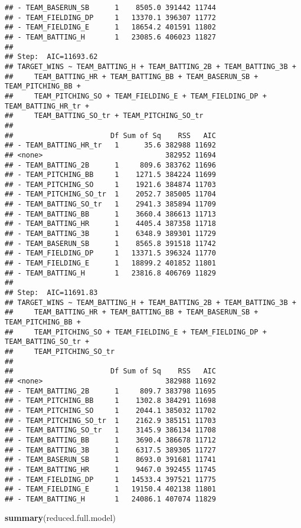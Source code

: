 \documentclass[]{article}
\newenvironment{Shaded}{\begin{snugshade}}{\end{snugshade}}
\newcommand{\KeywordTok}[1]{\textcolor[rgb]{0.13,0.29,0.53}{\textbf{#1}}}
\newcommand{\NormalTok}[1]{#1}
\begin{document}
\begin{verbatim}
## - TEAM_BASERUN_SB      1    8505.0 391442 11744
## - TEAM_FIELDING_DP     1   13370.1 396307 11772
## - TEAM_FIELDING_E      1   18654.2 401591 11802
## - TEAM_BATTING_H       1   23085.6 406023 11827
## 
## Step:  AIC=11693.62
## TARGET_WINS ~ TEAM_BATTING_H + TEAM_BATTING_2B + TEAM_BATTING_3B + 
##     TEAM_BATTING_HR + TEAM_BATTING_BB + TEAM_BASERUN_SB + TEAM_PITCHING_BB + 
##     TEAM_PITCHING_SO + TEAM_FIELDING_E + TEAM_FIELDING_DP + TEAM_BATTING_HR_tr + 
##     TEAM_BATTING_SO_tr + TEAM_PITCHING_SO_tr
## 
##                       Df Sum of Sq    RSS   AIC
## - TEAM_BATTING_HR_tr   1      35.6 382988 11692
## <none>                             382952 11694
## - TEAM_BATTING_2B      1     809.6 383762 11696
## - TEAM_PITCHING_BB     1    1271.5 384224 11699
## - TEAM_PITCHING_SO     1    1921.6 384874 11703
## - TEAM_PITCHING_SO_tr  1    2052.7 385005 11704
## - TEAM_BATTING_SO_tr   1    2941.3 385894 11709
## - TEAM_BATTING_BB      1    3660.4 386613 11713
## - TEAM_BATTING_HR      1    4405.4 387358 11718
## - TEAM_BATTING_3B      1    6348.9 389301 11729
## - TEAM_BASERUN_SB      1    8565.8 391518 11742
## - TEAM_FIELDING_DP     1   13371.5 396324 11770
## - TEAM_FIELDING_E      1   18899.2 401852 11801
## - TEAM_BATTING_H       1   23816.8 406769 11829
## 
## Step:  AIC=11691.83
## TARGET_WINS ~ TEAM_BATTING_H + TEAM_BATTING_2B + TEAM_BATTING_3B + 
##     TEAM_BATTING_HR + TEAM_BATTING_BB + TEAM_BASERUN_SB + TEAM_PITCHING_BB + 
##     TEAM_PITCHING_SO + TEAM_FIELDING_E + TEAM_FIELDING_DP + TEAM_BATTING_SO_tr + 
##     TEAM_PITCHING_SO_tr
## 
##                       Df Sum of Sq    RSS   AIC
## <none>                             382988 11692
## - TEAM_BATTING_2B      1     809.7 383798 11695
## - TEAM_PITCHING_BB     1    1302.8 384291 11698
## - TEAM_PITCHING_SO     1    2044.1 385032 11702
## - TEAM_PITCHING_SO_tr  1    2162.9 385151 11703
## - TEAM_BATTING_SO_tr   1    3145.9 386134 11708
## - TEAM_BATTING_BB      1    3690.4 386678 11712
## - TEAM_BATTING_3B      1    6317.5 389305 11727
## - TEAM_BASERUN_SB      1    8693.0 391681 11741
## - TEAM_BATTING_HR      1    9467.0 392455 11745
## - TEAM_FIELDING_DP     1   14533.4 397521 11775
## - TEAM_FIELDING_E      1   19150.4 402138 11801
## - TEAM_BATTING_H       1   24086.1 407074 11829
\end{verbatim}

\begin{Shaded}
\begin{Highlighting}[]
\KeywordTok{summary}\NormalTok{(reduced.full.model)  }
\end{Highlighting}
\end{Shaded}
\end{document}

